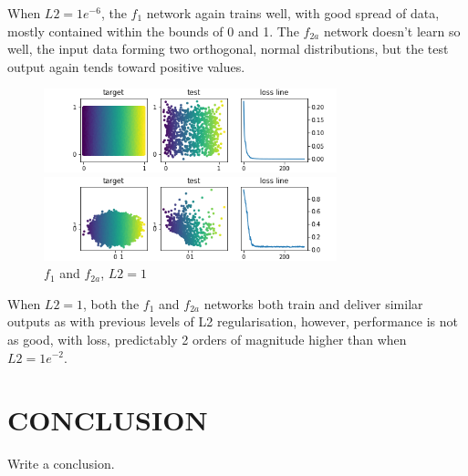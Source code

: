 \documentclass{article}
\begin{document}
When $L2 = 1e^{-6}$, the $f_1$ network again trains well, with good spread of data, mostly contained within the bounds of 0 and 1.  The $f_{2a}$ network doesn't learn so well, the input data forming two orthogonal, normal distributions, but the test output again tends toward positive values.

\begin{figure}[htb]
\begin{minipage}[b]{1\linewidth}
  \centering
  \centerline{\includegraphics[width=8.5cm]{f1_1_300_1000}}
\end{minipage}
%
\begin{minipage}[b]{1\linewidth}
  \centering
  \centerline{\includegraphics[width=8.5cm]{f2a_1_300_1000}}
\end{minipage}
%
\caption{$f_1$ and $f_{2a}$, $L2 = 1$}
\label{fig:res}

\end{figure}
\hfill

When $L2 = 1$, both the $f_1$ and $f_{2a}$ networks both train and deliver similar outputs as with previous levels of L2 regularisation, however, performance is not as good, with loss, predictably 2 orders of magnitude higher than when $L2 = 1e^{-2}$.



\section{CONCLUSION}
\label{sec:CONC}

Write a conclusion. 





\end{document}
